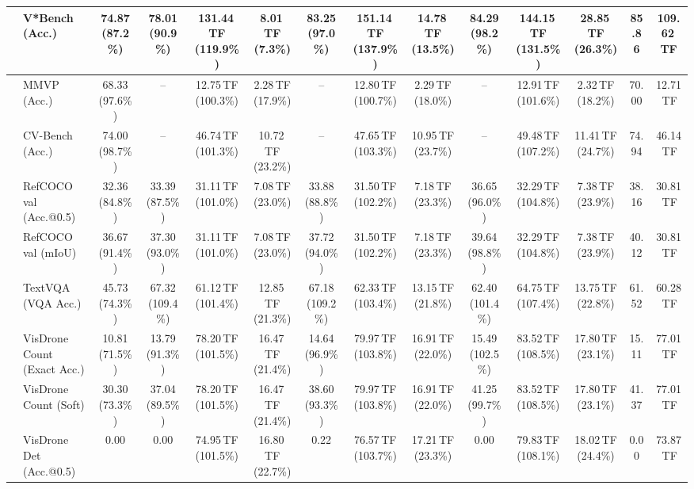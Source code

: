 \begin{table}[t]
\begin{center}
\begin{small}
\begin{sc}
{\begin{tabular}{llcccccccccccc}
& V*Bench (Acc.) & 74.87 (87.2\%) & 78.01 (90.9\%) & 131.44\,TF (119.9\%) & 8.01\,TF (7.3\%) & 83.25 (97.0\%) & 151.14\,TF (137.9\%) & 14.78\,TF (13.5\%) & 84.29 (98.2\%) & 144.15\,TF (131.5\%) & 28.85\,TF (26.3\%) & 85.86 & 109.62\,TF \\
\midrule
{}
& MMVP (Acc.) & 68.33 (97.6\%) & -- & 12.75\,TF (100.3\%) & 2.28\,TF (17.9\%) & -- & 12.80\,TF (100.7\%) & 2.29\,TF (18.0\%) & -- & 12.91\,TF (101.6\%) & 2.32\,TF (18.2\%) & 70.00 & 12.71\,TF \\
& CV-Bench (Acc.) & 74.00 (98.7\%) & -- & 46.74\,TF (101.3\%) & 10.72\,TF (23.2\%) & -- & 47.65\,TF (103.3\%) & 10.95\,TF (23.7\%) & -- & 49.48\,TF (107.2\%) & 11.41\,TF (24.7\%) & 74.94 & 46.14\,TF \\
& RefCOCO val (Acc.@0.5) & 32.36 (84.8\%) & 33.39 (87.5\%) & 31.11\,TF (101.0\%) & 7.08\,TF (23.0\%) & 33.88 (88.8\%) & 31.50\,TF (102.2\%) & 7.18\,TF (23.3\%) & 36.65 (96.0\%) & 32.29\,TF (104.8\%) & 7.38\,TF (23.9\%) & 38.16 & 30.81\,TF \\
& RefCOCO val (mIoU) & 36.67 (91.4\%) & 37.30 (93.0\%) & 31.11\,TF (101.0\%) & 7.08\,TF (23.0\%) & 37.72 (94.0\%) & 31.50\,TF (102.2\%) & 7.18\,TF (23.3\%) & 39.64 (98.8\%) & 32.29\,TF (104.8\%) & 7.38\,TF (23.9\%) & 40.12 & 30.81\,TF \\
& TextVQA (VQA Acc.) & 45.73 (74.3\%) & 67.32 (109.4\%) & 61.12\,TF (101.4\%) & 12.85\,TF (21.3\%) & 67.18 (109.2\%) & 62.33\,TF (103.4\%) & 13.15\,TF (21.8\%) & 62.40 (101.4\%) & 64.75\,TF (107.4\%) & 13.75\,TF (22.8\%) & 61.52 & 60.28\,TF \\
& VisDrone Count (Exact Acc.) & 10.81 (71.5\%) & 13.79 (91.3\%) & 78.20\,TF (101.5\%) & 16.47\,TF (21.4\%) & 14.64 (96.9\%) & 79.97\,TF (103.8\%) & 16.91\,TF (22.0\%) & 15.49 (102.5\%) & 83.52\,TF (108.5\%) & 17.80\,TF (23.1\%) & 15.11 & 77.01\,TF \\
& VisDrone Count (Soft) & 30.30 (73.3\%) & 37.04 (89.5\%) & 78.20\,TF (101.5\%) & 16.47\,TF (21.4\%) & 38.60 (93.3\%) & 79.97\,TF (103.8\%) & 16.91\,TF (22.0\%) & 41.25 (99.7\%) & 83.52\,TF (108.5\%) & 17.80\,TF (23.1\%) & 41.37 & 77.01\,TF \\
& VisDrone Det (Acc.@0.5) & 0.00 & 0.00 & 74.95\,TF (101.5\%) & 16.80\,TF (22.7\%) & 0.22 & 76.57\,TF (103.7\%) & 17.21\,TF (23.3\%) & 0.00 & 79.83\,TF (108.1\%) & 18.02\,TF (24.4\%) & 0.00 & 73.87\,TF \\

\end{tabular}}
\end{sc}
\end{small}
\end{center}
\end{table}
